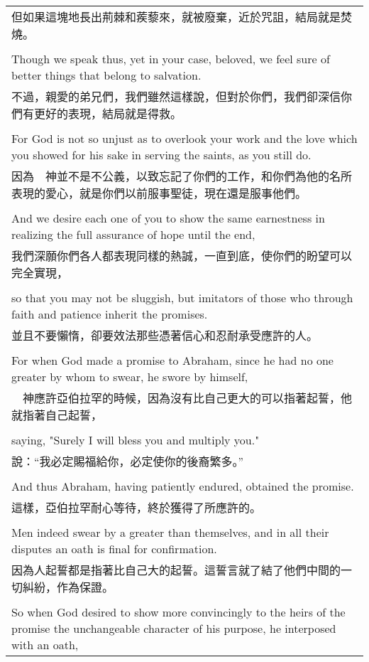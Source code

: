 \begin{tabularx}{\textwidth}{p{}}
但如果這塊地長出荊棘和蒺藜來，就被廢棄，近於咒詛，結局就是焚燒。 \\ \\
Though we speak thus, yet in your case, beloved, we feel sure of better things that belong to salvation. \\
不過，親愛的弟兄們，我們雖然這樣說，但對於你們，我們卻深信你們有更好的表現，結局就是得救。 \\ \\
For God is not so unjust as to overlook your work and the love which you showed for his sake in serving the saints, as you still do. \\
因為　神並不是不公義，以致忘記了你們的工作，和你們為他的名所表現的愛心，就是你們以前服事聖徒，現在還是服事他們。 \\ \\
And we desire each one of you to show the same earnestness in realizing the full assurance of hope until the end, \\
我們深願你們各人都表現同樣的熱誠，一直到底，使你們的盼望可以完全實現， \\ \\
so that you may not be sluggish, but imitators of those who through faith and patience inherit the promises. \\
並且不要懶惰，卻要效法那些憑著信心和忍耐承受應許的人。 \\ \\
For when God made a promise to Abraham, since he had no one greater by whom to swear, he swore by himself, \\
　神應許亞伯拉罕的時候，因為沒有比自己更大的可以指著起誓，他就指著自己起誓， \\ \\
saying, "Surely I will bless you and multiply you." \\
說：“我必定賜福給你，必定使你的後裔繁多。” \\ \\
And thus Abraham, having patiently endured, obtained the promise. \\
這樣，亞伯拉罕耐心等待，終於獲得了所應許的。 \\ \\
Men indeed swear by a greater than themselves, and in all their disputes an oath is final for confirmation. \\
因為人起誓都是指著比自己大的起誓。這誓言就了結了他們中間的一切糾紛，作為保證。 \\ \\
So when God desired to show more convincingly to the heirs of the promise the unchangeable character of his purpose, he interposed with an oath, \\

\end{tabularx}
